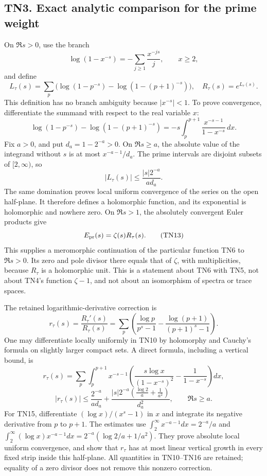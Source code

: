 \documentclass[
  10pt,
  a4paper,
]{article}
\begin{document}
\subsection{TN3. Exact analytic comparison for the prime
weight}\label{tn3.-exact-analytic-comparison-for-the-prime-weight}

On \(\Re s>0\), use the branch \[
\log(1-x^{-s})=-\sum_{j\ge1}\frac{x^{-js}}j,\qquad x\ge2,
\] and define \[
L_\tau(s)=\sum_p\bigl(\log(1-p^{-s})-\log(1-(p+1)^{-s})\bigr),
\quad R_\tau(s)=e^{L_\tau(s)}.
\tag{TN10}
\] This definition has no branch ambiguity because \(|x^{-s}|<1\). To
prove convergence, differentiate the summand with respect to the real
variable \(x\): \[
\log(1-p^{-s})-\log(1-(p+1)^{-s})
=-s\int_p^{p+1}\frac{x^{-s-1}}{1-x^{-s}}\,dx.
\tag{TN11}
\] Fix \(a>0\), and put \(d_a=1-2^{-a}>0\). On \(\Re s\ge a\), the
absolute value of the integrand without \(s\) is at most
\(x^{-a-1}/d_a\). The prime intervals are disjoint subsets of
\([2,\infty)\), so \[
|L_\tau(s)|\le \frac{|s|2^{-a}}{a d_a}.
\tag{TN12}
\] The same domination proves local uniform convergence of the series on
the open half-plane. It therefore defines a holomorphic function, and
its exponential is holomorphic and nowhere zero. On \(\Re s>1\), the
absolutely convergent Euler products give \[
E_{\rm pr}(s)=\zeta(s)R_\tau(s).
\tag{TN13}
\] This supplies a meromorphic continuation of the particular function
TN6 to \(\Re s>0\). Its zero and pole divisor there equals that of
\(\zeta\), with multiplicities, because \(R_\tau\) is a holomorphic
unit. This is a statement about TN6 with TN5, not about TN4's function
\(\zeta-1\), and not about an isomorphism of spectra or trace spaces.

The retained logarithmic-derivative correction is \[
r_\tau(s)=\frac{R_\tau'(s)}{R_\tau(s)}
=\sum_p\left(\frac{\log p}{p^s-1}
-\frac{\log(p+1)}{(p+1)^s-1}\right).
\tag{TN14}
\] One may differentiate locally uniformly in TN10 by holomorphy and
Cauchy's formula on slightly larger compact sets. A direct formula,
including a vertical bound, is \[
r_\tau(s)=\sum_p\int_p^{p+1}x^{-s-1}
\left(\frac{s\log x}{(1-x^{-s})^2}-\frac1{1-x^{-s}}\right)dx,
\tag{TN15}
\] \[
|r_\tau(s)|\le
\frac{2^{-a}}{a d_a}
+\frac{\displaystyle |s|2^{-a}\left(\frac{\log2}{a}+\frac1{a^2}\right)}{d_a^2},
\qquad \Re s\ge a.
\tag{TN16}
\] For TN15, differentiate \((\log x)/(x^s-1)\) in \(x\) and integrate
its negative derivative from \(p\) to \(p+1\). The estimates use
\(\int_2^\infty x^{-a-1}dx=2^{-a}/a\) and
\(\int_2^\infty(\log x)x^{-a-1}dx=2^{-a}(\log2/a+1/a^2)\). They prove
absolute local uniform convergence, and show that \(r_\tau\) has at most
linear vertical growth in every fixed strip inside this half-plane. All
quantities in TN10--TN16 are retained; equality of a zero divisor does
not remove this nonzero correction.
\end{document}
